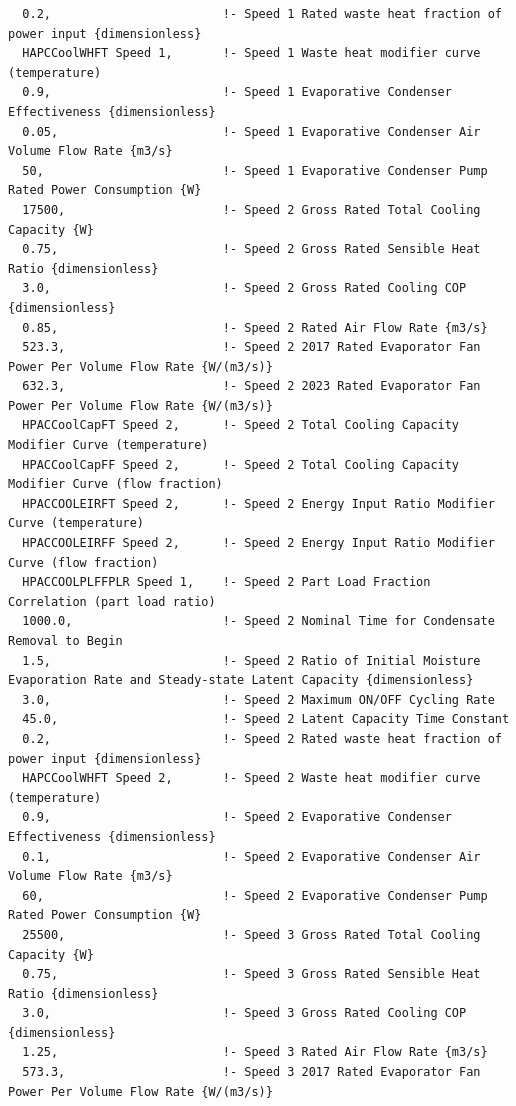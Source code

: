 \begin{lstlisting}
  0.2,                        !- Speed 1 Rated waste heat fraction of power input {dimensionless}
  HAPCCoolWHFT Speed 1,       !- Speed 1 Waste heat modifier curve (temperature)
  0.9,                        !- Speed 1 Evaporative Condenser Effectiveness {dimensionless}
  0.05,                       !- Speed 1 Evaporative Condenser Air Volume Flow Rate {m3/s}
  50,                         !- Speed 1 Evaporative Condenser Pump Rated Power Consumption {W}
  17500,                      !- Speed 2 Gross Rated Total Cooling Capacity {W}
  0.75,                       !- Speed 2 Gross Rated Sensible Heat Ratio {dimensionless}
  3.0,                        !- Speed 2 Gross Rated Cooling COP {dimensionless}
  0.85,                       !- Speed 2 Rated Air Flow Rate {m3/s}
  523.3,                      !- Speed 2 2017 Rated Evaporator Fan Power Per Volume Flow Rate {W/(m3/s)}
  632.3,                      !- Speed 2 2023 Rated Evaporator Fan Power Per Volume Flow Rate {W/(m3/s)}
  HPACCoolCapFT Speed 2,      !- Speed 2 Total Cooling Capacity Modifier Curve (temperature)
  HPACCoolCapFF Speed 2,      !- Speed 2 Total Cooling Capacity Modifier Curve (flow fraction)
  HPACCOOLEIRFT Speed 2,      !- Speed 2 Energy Input Ratio Modifier Curve (temperature)
  HPACCOOLEIRFF Speed 2,      !- Speed 2 Energy Input Ratio Modifier Curve (flow fraction)
  HPACCOOLPLFFPLR Speed 1,    !- Speed 2 Part Load Fraction Correlation (part load ratio)
  1000.0,                     !- Speed 2 Nominal Time for Condensate Removal to Begin
  1.5,                        !- Speed 2 Ratio of Initial Moisture Evaporation Rate and Steady-state Latent Capacity {dimensionless}
  3.0,                        !- Speed 2 Maximum ON/OFF Cycling Rate
  45.0,                       !- Speed 2 Latent Capacity Time Constant
  0.2,                        !- Speed 2 Rated waste heat fraction of power input {dimensionless}
  HAPCCoolWHFT Speed 2,       !- Speed 2 Waste heat modifier curve (temperature)
  0.9,                        !- Speed 2 Evaporative Condenser Effectiveness {dimensionless}
  0.1,                        !- Speed 2 Evaporative Condenser Air Volume Flow Rate {m3/s}
  60,                         !- Speed 2 Evaporative Condenser Pump Rated Power Consumption {W}
  25500,                      !- Speed 3 Gross Rated Total Cooling Capacity {W}
  0.75,                       !- Speed 3 Gross Rated Sensible Heat Ratio {dimensionless}
  3.0,                        !- Speed 3 Gross Rated Cooling COP {dimensionless}
  1.25,                       !- Speed 3 Rated Air Flow Rate {m3/s}
  573.3,                      !- Speed 3 2017 Rated Evaporator Fan Power Per Volume Flow Rate {W/(m3/s)}

\end{lstlisting}
